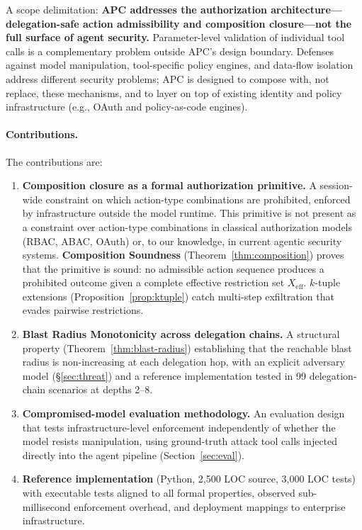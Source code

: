 \documentclass[sigconf,nonacm]{acmart}
\begin{document}
A scope delimitation: \textbf{APC addresses the authorization architecture---delegation-safe action admissibility and composition closure---not the full surface of agent security.} Parameter-level validation of individual tool calls is a complementary problem outside APC's design boundary. Defenses against model manipulation, tool-specific policy engines, and data-flow isolation address different security problems; APC is designed to compose with, not replace, these mechanisms, and to layer on top of existing identity and policy infrastructure (e.g., OAuth and policy-as-code engines).

\paragraph{Contributions.} The contributions are:
\begin{enumerate}
\item \textbf{Composition closure as a formal authorization primitive.} A session-wide constraint on which action-type combinations are prohibited, enforced by infrastructure outside the model runtime. This primitive is not present as a constraint over action-type combinations in classical authorization models (RBAC, ABAC, OAuth) or, to our knowledge, in current agentic security systems. \textbf{Composition Soundness} (Theorem~\ref{thm:composition}) proves that the primitive is sound: no admissible action sequence produces a prohibited outcome given a complete effective restriction set $X_{\mathrm{eff}}$. $k$-tuple extensions (Proposition~\ref{prop:ktuple}) catch multi-step exfiltration that evades pairwise restrictions.
\item \textbf{Blast Radius Monotonicity across delegation chains.} A structural property (Theorem~\ref{thm:blast-radius}) establishing that the reachable blast radius is non-increasing at each delegation hop, with an explicit adversary model (\S\ref{sec:threat}) and a reference implementation tested in 99 delegation-chain scenarios at depths 2--8.
\item \textbf{Compromised-model evaluation methodology.} An evaluation design that tests infrastructure-level enforcement independently of whether the model resists manipulation, using ground-truth attack tool calls injected directly into the agent pipeline (Section~\ref{sec:eval}).
\item \textbf{Reference implementation} (Python, 2,500 LOC source, 3,000 LOC tests) with executable tests aligned to all formal properties, observed sub-millisecond enforcement overhead, and deployment mappings to enterprise infrastructure.
\end{enumerate}
\end{document}
